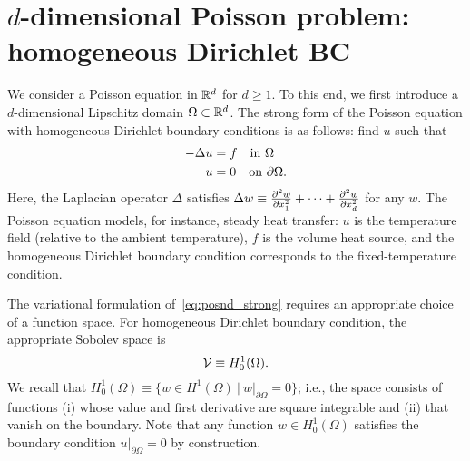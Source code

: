 \section{$d$-dimensional Poisson problem: homogeneous Dirichlet BC}
\label{sec:posnd_homo_dir}
We consider a Poisson equation in $\mathbb{R}^d$ for $d \geq 1$.  To this end, we first introduce a $d$-dimensional Lipschitz domain $\Omega \subset \mathbb{R}^d$. The strong form of the Poisson equation with homogeneous Dirichlet boundary conditions is as follows: find $u$ such that
\begin{align}
  - \Delta u &= f \quad \text{in } \Omega \label{eq:posnd_strong} \\
  u &= 0 \quad \text{on } \partial \Omega \notag.
\end{align}
 Here, the Laplacian operator $\Delta$ satisfies $\Delta w \equiv \frac{\partial ^2w}{\partial x^2_1} + \cdots + \frac{\partial ^2w}{\partial x^2_d}$ for any $w$.  The Poisson equation models, for instance, steady heat transfer: $u$ is the temperature field (relative to the ambient temperature), $f$ is the volume heat source, and the homogeneous Dirichlet boundary condition corresponds to the fixed-temperature condition.

The variational formulation of~\eqref{eq:posnd_strong} requires an appropriate choice of a function space.  For homogeneous Dirichlet boundary condition, the appropriate Sobolev space is
\begin{equation*}
  \mathcal{V} \equiv H^1_0(\Omega).
\end{equation*}
We recall that $H^1_0(\Omega) \equiv \{ w \in H^1(\Omega) \ | \ w|_{\partial \Omega} = 0 \}$; i.e., the space consists of functions (i) whose value and first derivative are square integrable and (ii) that vanish on the boundary.  Note that any function $w \in H^1_0(\Omega)$ satisfies the boundary condition $u|_{\partial \Omega} = 0$ by construction.

